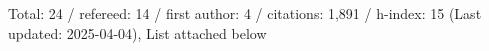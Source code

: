 Total: 24 / refereed: 14 / first author: 4 / citations: 1,891 / h-index: 15 (Last updated: 2025-04-04), List attached below